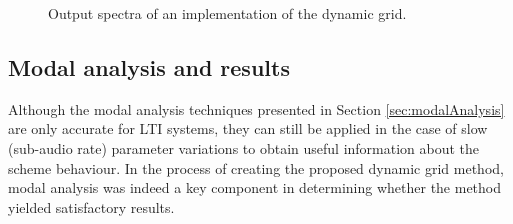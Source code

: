 \begin{figure}[h]
    \centering
    \hfill
    \caption{Output spectra of an implementation of the dynamic grid.}\label{fig:specResults}
\end{figure}
\subsection{Modal analysis and results}\label{sec:modalAnalysisQuadDynamic}
Although the modal analysis techniques presented in Section \ref{sec:modalAnalysis} are only accurate for LTI systems, they can still be applied in the case of slow (sub-audio rate) parameter variations to obtain useful information about the scheme behaviour. In the process of creating the proposed dynamic grid method, modal analysis was indeed a key component in determining whether the method yielded satisfactory results.  


